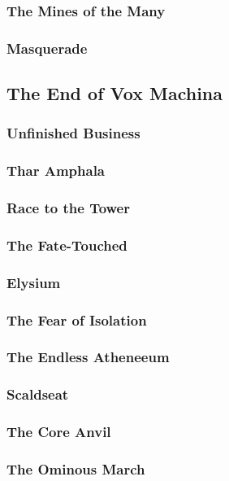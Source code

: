         \subsubsection{The Mines of the Many}
        \subsubsection{Masquerade}
        
    \newpage
    \subsection{The End of Vox Machina} \vspace*{\fill}
    \newpage
        \subsubsection{Unfinished Business}
        \subsubsection{Thar Amphala}
        \subsubsection{Race to the Tower}
        \subsubsection{The Fate-Touched}
        \subsubsection{Elysium}
        \subsubsection{The Fear of Isolation}
        \subsubsection{The Endless Atheneeum}
        \subsubsection{Scaldseat}
        \subsubsection{The Core Anvil}
        \subsubsection{The Ominous March}
